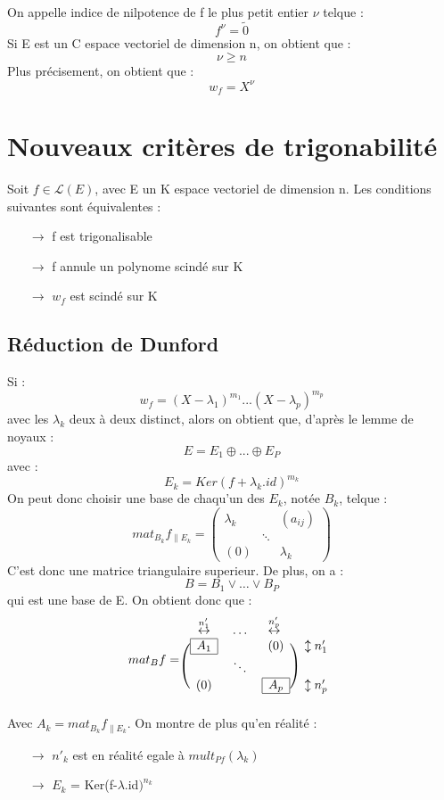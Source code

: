\begin{de}
On appelle indice de nilpotence de f le plus petit entier $\nu$ telque : 
$$f^{\nu} = \tilde{0}$$
Si E est un C espace vectoriel de dimension n, on obtient que : 
$$\nu \geq n$$
Plus précisement, on obtient que : 
$$w_f = X^{\nu}$$
\end{de}
\section{Nouveaux critères de trigonabilité}
\begin{theo}
Soit $f \in \mathcal{L}(E)$, avec E un K espace vectoriel de dimension n. Les conditions suivantes sont équivalentes : 
\begin{itemize}
 \item[$\rightarrow$] f est trigonalisable
 \item[$\rightarrow$] f annule un polynome scindé sur K
 \item[$\rightarrow$] $w_f$ est scindé sur K
\end{itemize}
\end{theo}
\subsection{Réduction de Dunford}
Si :
$$w_f = (X - \lambda_1)^{m_1}...(X - \lambda_p)^{m_p}$$
avec les $\lambda_k$ deux à deux distinct, alors on obtient que, d'après le lemme de noyaux : 
$$E = E_1 \oplus ... \oplus E_P$$
avec : 
$$E_k = Ker(f + \lambda_k.id)^{m_k}$$
On peut donc choisir une base de chaqu'un des $E_k$, notée $B_k$, telque :
$$mat_{B_k}f_{\parallel E_k} = \begin{pmatrix}
          \lambda_k &  & (a_{ij}) \\
	   & \ddots & \\
          (0) &  & \lambda_k
         \end{pmatrix}$$
C'est donc une matrice triangulaire superieur. De plus, on a : 
$$B = B_1 \vee \dots \vee B_P$$
qui est une base de E. On obtient donc que : 
\[mat_B f = \begin{blockarray}{cccc}
        \overset{n'_1}\leftrightarrow & \dots & \overset{n'_p}\leftrightarrow  \\
        \begin{block}{(ccc)c}
        \mesbloc{A_{1}}  &  & (0) & \updownarrow n'_1   \\
          & \ddots &  &       \\
        (0) &   & \mesbloc{A_{p}} & \updownarrow n'_p      \\
        \end{block}
        \end{blockarray}
\] 
Avec $A_k = mat_{B_k}f_{\parallel E_k}$. On montre de plus qu'en réalité : 
\begin{itemize}
 \item[$\rightarrow$] $n'_k$ est en réalité egale à $mult_{Pf}(\lambda_k)$
 \item[$\rightarrow$] $E_k$ = Ker(f-$\lambda$.id$)^{n_k}$
\end{itemize}
